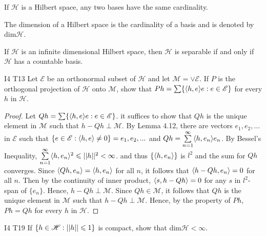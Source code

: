 \begin{proposition}{}{}
    If $\mathscr{H}$ is a Hilbert space, any two bases have the same cardinality.
\end{proposition}

\begin{definition}{}{}
    The dimension of a Hilbert space is the cardinality of a basis 
and is denoted by dim$\mathscr{H}$.
\end{definition}

\begin{proposition}{}{}
    If $\mathscr{H}$ is an infinite dimensional Hilbert space, 
    then $\mathscr{H}$ is separable if and only if $\mathscr{H}$ has a countable basis.
\end{proposition}

\begin{exercise}{I4 T13}{}
    Let $\mathscr{E}$ be an orthonormal subset of $\mathscr{H}$ and let $\mathscr{M}=\vee \mathscr{E}$. 
    If $P$ is the orthogonal projection of $\mathscr{H}$ onto $\mathscr{M}$,
    show that $Ph=\sum\{\langle h,e\rangle e:e\in\mathscr{E}\}$ for every $h$ in $\mathscr{H}$.
\end{exercise}
\begin{proof}
    Let $Qh=\sum\{\langle h,e\rangle e:e\in\mathscr{E}\}$.
    it suffices to show that $Qh$ is the unique element in $\mathscr{M}$ such that $h-Qh\perp \mathscr{M}$.
    By Lemma 4.12, there are vectors $e_1,e_2,...$ in $\mathscr{E}$ such that $\{e\in\mathscr{E}:\langle h,e\rangle\neq 0\}={e_1,e_2,...}$
    and $Qh=\sum\limits_{n=1}^{\infty}\langle h,e_n\rangle e_n$.
    By Bessel's Inequality, $\sum\limits_{n=1}^{\infty}\langle h,e_n\rangle^2\leqslant ||h||^2<\infty$.
    and thus $\{\langle h,e_n\rangle\}$ is $l^2$ and the sum for $Qh$ converges. Since $\langle Qh,e_n\rangle=\langle h,e_n\rangle$ for all $n$, 
    it follows that $\langle h-Qh,e_n\rangle=0$ for all $n$. Then by the continuity of inner product, 
    $\langle s,h-Qh\rangle= 0$ for any $s$ in $l^2$-span of $\{e_n\}$. Hence, $h-Qh\perp \mathscr{M}$.
    Since $Qh\in \mathscr{M}$, it follows that $Qh$ is the unique element in $\mathscr{M}$
    such that $h-Qh\perp \mathscr{M}$. Hence, by the property of $Ph$, $Ph=Qh$ for every $h$ in $\mathscr{H}$.
\end{proof}


\begin{exercise}{I4 T19}{}
    If $\{h\in \mathscr{H}: ||h||\leqslant 1\}$ is compact, show that dim$\mathscr{H}<\infty$.
\end{exercise}

